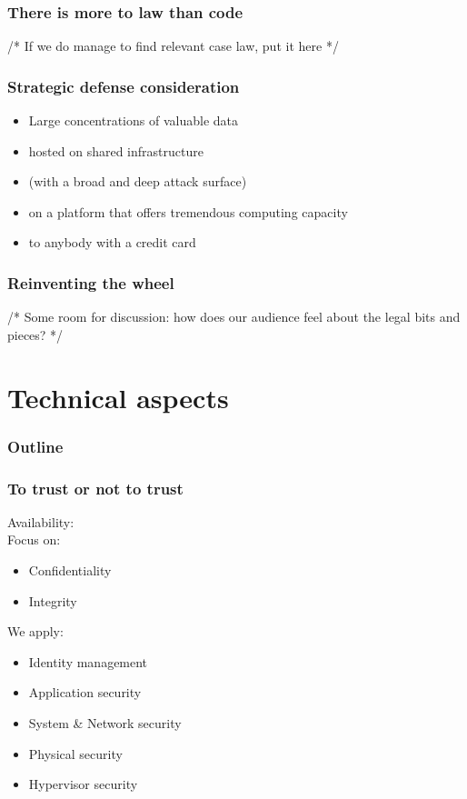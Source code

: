 \documentclass{beamer}
\begin{document}
\begin{frame}
    \frametitle{There is more to law than code}
    /* If we do manage to find relevant case law, put it here */
\end{frame}

\begin{frame}
    \frametitle{Strategic defense consideration}
    \begin{itemize}
      \item Large concentrations of valuable data
      \item hosted on shared infrastructure
      \item (with a broad and deep attack surface)
      \item on a platform that offers tremendous computing capacity
      \item to anybody with a credit card
    \end{itemize}
\end{frame}

\begin{frame}
    \frametitle{Reinventing the wheel}
    /* Some room for discussion: how does our audience feel about the legal
    bits and pieces? */
\end{frame}

\section{Technical aspects}

\begin{frame}
  \frametitle{Outline}
\end{frame}

\begin{frame}
    \frametitle{To trust or not to trust}

    Availability: \checkmark \\
    Focus on:
    \begin{itemize}
      \item Confidentiality
      \item Integrity
    \end{itemize}
    We apply:
    \begin{itemize} %
      \item Identity management
      \item Application security
      \item System \& Network security
      \item Physical security
      \item Hypervisor security %
    \end{itemize}
\end{frame}
\end{document}
